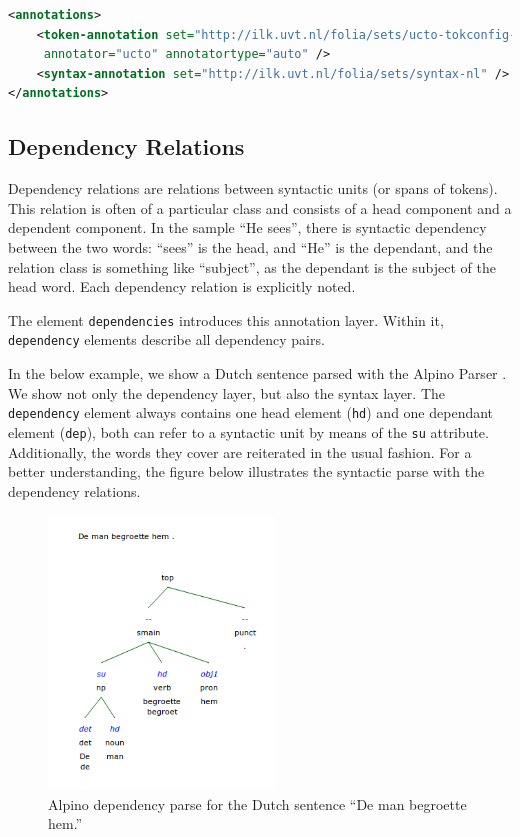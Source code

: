 \documentclass[a4paper,12pt]{report}
\begin{document}
\begin{lstlisting}[language=xml]
<annotations>
    <token-annotation set="http://ilk.uvt.nl/folia/sets/ucto-tokconfig-nl" 
     annotator="ucto" annotatortype="auto" />
    <syntax-annotation set="http://ilk.uvt.nl/folia/sets/syntax-nl" />
</annotations>
\end{lstlisting}

\subsection{Dependency Relations}

Dependency relations are relations between syntactic units (or spans of tokens). This relation is often of a particular class and consists of a head component and a dependent component. In the sample ``He sees'', there is  syntactic dependency between the two words: ``sees'' is the head, and ``He'' is the dependant, and the relation class is something like ``subject'', as the dependant is the subject of the head word. Each dependency relation is explicitly noted.

The element \texttt{dependencies} introduces this annotation layer. Within it, \texttt{dependency} elements describe all dependency pairs. 

In the below example, we show a Dutch sentence parsed with the Alpino Parser \cite{ALPINO}. We show not only the dependency layer, but also the syntax layer. The \texttt{dependency} element always contains one head element (\texttt{hd}) and one dependant element (\texttt{dep}), both can refer to a syntactic unit by means of the \texttt{su} attribute. Additionally, the words they cover are reiterated in the usual fashion. For a better understanding, the figure below illustrates the syntactic parse with the dependency relations.

\begin{figure}[h]
\begin{center}
\includegraphics[width=60.0mm]{alpino.png}
\end{center}
\caption{Alpino dependency parse for the Dutch sentence ``De man begroette hem.''}
\label{fig:arch} 
\end{figure}
\FloatBarrier
\end{document}
